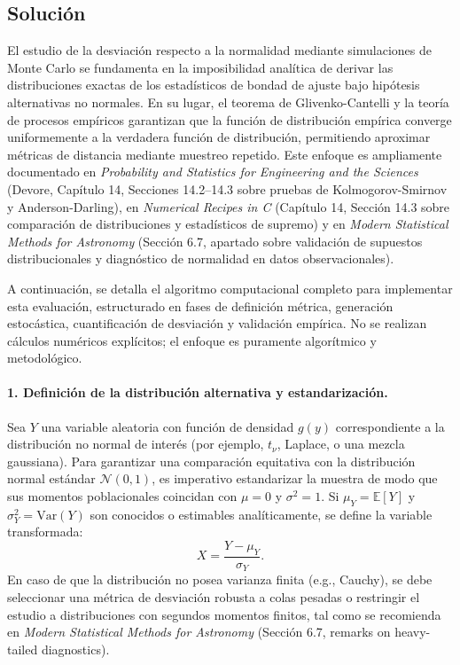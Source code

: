 \documentclass[12pt]{article}
\begin{document}
\subsection{Solución}
El estudio de la desviación respecto a la normalidad mediante simulaciones de Monte Carlo se fundamenta en la imposibilidad analítica de derivar las distribuciones exactas de los estadísticos de bondad de ajuste bajo hipótesis alternativas no normales. En su lugar, el teorema de Glivenko-Cantelli y la teoría de procesos empíricos garantizan que la función de distribución empírica converge uniformemente a la verdadera función de distribución, permitiendo aproximar métricas de distancia mediante muestreo repetido. Este enfoque es ampliamente documentado en \textit{Probability and Statistics for Engineering and the Sciences} (Devore, Capítulo 14, Secciones 14.2--14.3 sobre pruebas de Kolmogorov-Smirnov y Anderson-Darling), en \textit{Numerical Recipes in C} (Capítulo 14, Sección 14.3 sobre comparación de distribuciones y estadísticos de supremo) y en \textit{Modern Statistical Methods for Astronomy} (Sección 6.7, apartado sobre validación de supuestos distribucionales y diagnóstico de normalidad en datos observacionales).

A continuación, se detalla el algoritmo computacional completo para implementar esta evaluación, estructurado en fases de definición métrica, generación estocástica, cuantificación de desviación y validación empírica. No se realizan cálculos numéricos explícitos; el enfoque es puramente algorítmico y metodológico.

\paragraph{1. Definición de la distribución alternativa y estandarización.}
Sea $Y$ una variable aleatoria con función de densidad $g(y)$ correspondiente a la distribución no normal de interés (por ejemplo, $t_\nu$, Laplace, o una mezcla gaussiana). Para garantizar una comparación equitativa con la distribución normal estándar $\mathcal{N}(0,1)$, es imperativo estandarizar la muestra de modo que sus momentos poblacionales coincidan con $\mu=0$ y $\sigma^2=1$. Si $\mu_Y = \mathbb{E}[Y]$ y $\sigma_Y^2 = \text{Var}(Y)$ son conocidos o estimables analíticamente, se define la variable transformada:
$$
X = \frac{Y - \mu_Y}{\sigma_Y}.
$$
En caso de que la distribución no posea varianza finita (e.g., Cauchy), se debe seleccionar una métrica de desviación robusta a colas pesadas o restringir el estudio a distribuciones con segundos momentos finitos, tal como se recomienda en \textit{Modern Statistical Methods for Astronomy} (Sección 6.7, remarks on heavy-tailed diagnostics).
\end{document}
